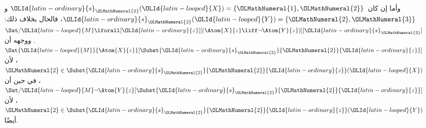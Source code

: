 \documentclass[../../../include/open-logic-section]{subfiles}
\begin{document}
\begin{ex}
  وأما إن كان~${\OLId{latin-ordinary}{s}}_{\OLMathNumeral{2}}({\OLId{latin-looped}{X}}) = \{{\OLMathNumeral{1}}, {\OLMathNumeral{2}}\}$ و
  ${\OLId{latin-ordinary}{s}}_{\OLMathNumeral{2}}({\OLId{latin-looped}{Y}}) = \{{\OLMathNumeral{2}}, {\OLMathNumeral{3}}\}$، فالحال بخلاف ذلك:
  $\Sat/{{\OLId{latin-looped}{M}}}{\lforall[{\OLId{latin-ordinary}{z}}][(\Atom{X}{z} \liff \lnot
      \Atom{Y}{z})]}[{\OLId{latin-ordinary}{s}}_{\OLMathNumeral{2}}]$. ووجهه أن
  $\Sat{{\OLId{latin-looped}{M}}}{\Atom{X}{z}}[\Subst{{\OLId{latin-ordinary}{s}}_{\OLMathNumeral{2}}}{{\OLMathNumeral{2}}}{{\OLId{latin-ordinary}{z}}}]$، لأن
  ${\OLMathNumeral{2}} \in \Subst{{\OLId{latin-ordinary}{s}}_{\OLMathNumeral{2}}}{{\OLMathNumeral{2}}}{{\OLId{latin-ordinary}{z}}}({\OLId{latin-looped}{X}})$، في حين أن
  $\Sat/{{\OLId{latin-looped}{M}}}{\lnot \Atom{Y}{z}}[\Subst{{\OLId{latin-ordinary}{s}}_{\OLMathNumeral{2}}}{{\OLMathNumeral{2}}}{{\OLId{latin-ordinary}{z}}}]$، لأن
  ${\OLMathNumeral{2}} \in \Subst{{\OLId{latin-ordinary}{s}}_{\OLMathNumeral{2}}}{{\OLMathNumeral{2}}}{{\OLId{latin-ordinary}{z}}}({\OLId{latin-looped}{Y}})$ أيضًا.
\end{ex}
\end{document}

